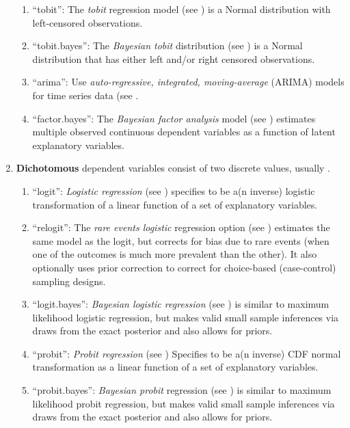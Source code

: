 \documentclass[letterpaper,10pt,english]{sphinxmanual}
\begin{document}
\begin{enumerate}
\begin{enumerate}
\item {} 
“tobit”: The \emph{tobit} regression model (see ) is a Normal
distribution with left-censored observations.

\item {} 
“tobit.bayes”: The \emph{Bayesian tobit} distribution (see ) is a
Normal distribution that has either left and/or right censored
observations.

\item {} 
“arima”: Use \emph{auto-regressive, integrated, moving-average} (ARIMA)
models for time series data (see .

\item {} 
“factor.bayes”: The \emph{Bayesian factor analysis} model (see )
estimates multiple observed continuous dependent variables as a
function of latent explanatory variables.

\end{enumerate}

\item {} 
\textbf{Dichotomous} dependent variables consist of two discrete values,
usually .
\begin{enumerate}
\item {} 
“logit”: \emph{Logistic regression} (see ) specifies 
to be a(n inverse) logistic transformation of a linear function of
a set of explanatory variables.

\item {} 
“relogit”: The \emph{rare events logistic} regression option (see )
estimates the same model as the logit, but corrects for bias due
to rare events (when one of the outcomes is much more prevalent
than the other). It also optionally uses prior correction to
correct for choice-based (case-control) sampling designs.

\item {} 
“logit.bayes”: \emph{Bayesian logistic regression} (see ) is similar to
maximum likelihood logistic regression, but makes valid small
sample inferences via draws from the exact posterior and also
allows for priors.

\item {} 
“probit”: \emph{Probit regression} (see ) Specifies  to
be a(n inverse) CDF normal transformation as a linear function of
a set of explanatory variables.

\item {} 
“probit.bayes”: \emph{Bayesian probit} regression (see ) is similar to
maximum likelihood probit regression, but makes valid small sample
inferences via draws from the exact posterior and also allows for
priors.


\end{enumerate}
\end{enumerate}
\end{document}
